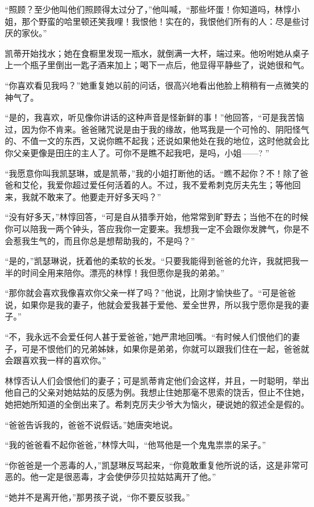 \par “照顾？至少他叫他们照顾得太过分了，”他叫喊，“那些坏蛋！你知道吗，林惇小姐，那个野蛮的哈里顿还笑我哩！我恨他！实在的，我恨他们所有的人：尽是些讨厌的家伙。”
\par 凯蒂开始找水；她在食橱里发现一瓶水，就倒满一大杯，端过来。他吩咐她从桌子上一个瓶子里倒出一匙子酒来加上；喝下一点后，他显得平静些了，说她很和气。
\par “你喜欢看见我吗？”她重复她以前的问话，很高兴地看出他脸上稍稍有一点微笑的神气了。
\par “是的，我喜欢，听见像你讲话的这种声音是怪新鲜的事！”他回答，“可是我苦恼过，因为你不肯来。爸爸赌咒说是由于我的缘故，他骂我是一个可怜的、阴阳怪气的、不值一文的东西，又说你瞧不起我；还说如果他处在我的地位，这时他就会比你父亲更像是田庄的主人了。可你不是瞧不起我吧，是吗，小姐——? ”
\par “我愿意你叫我凯瑟琳，或是凯蒂，”我的小姐打断他的话。“瞧不起你？不！除了爸爸和艾伦，我爱你超过爱任何活着的人。不过，我不爱希刺克厉夫先生；等他回来，我就不敢来了。他要走开好多天吗？”
\par “没有好多天，”林惇回答，“可是自从猎季开始，他常常到旷野去；当他不在的时候你可以陪我一两个钟头，答应我你一定要来。我想我一定不会跟你发脾气，你是不会惹我生气的，而且你总是想帮助我的，不是吗？”
\par “是的，”凯瑟琳说，抚着他的柔软的长发。“只要我能得到爸爸的允许，我就把我一半的时间全用来陪你。漂亮的林惇！我但愿你是我的弟弟。”
\par “那你就会喜欢我像喜欢你父亲一样了吗？”他说，比刚才愉快些了。“可是爸爸说，如果你是我的妻子，他就会爱我甚于爱他、爱全世界，所以我宁愿你是我的妻子。”
\par “不，我永远不会爱任何人甚于爱爸爸，”她严肃地回嘴。“有时候人们恨他们的妻子，可是不恨他们的兄弟姊妹，如果你是弟弟，你就可以跟我们住在一起，爸爸就会跟喜欢我一样的喜欢你。”
\par 林惇否认人们会恨他们的妻子；可是凯蒂肯定他们会这样，并且，一时聪明，举出他自己的父亲对她姑姑的反感为例。我想止住她那毫不思索的饶舌，但止不住她，她把她所知道的全倒出来了。希刺克厉夫少爷大为恼火，硬说她的叙述全是假的。
\par “爸爸告诉我的，爸爸不说假话。”她唐突地说。
\par “我的爸爸看不起你爸爸，”林惇大叫，“他骂他是一个鬼鬼祟祟的呆子。”
\par “你爸爸是一个恶毒的人，”凯瑟琳反骂起来，“你竟敢重复他所说的话，这是非常可恶的。他一定是很恶毒，才会使伊莎贝拉姑姑离开了他。”
\par “她并不是离开他，”那男孩子说，“你不要反驳我。”
